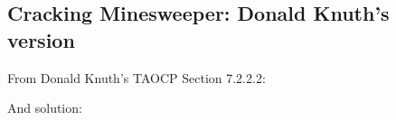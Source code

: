 \subsection{Cracking Minesweeper: Donald Knuth's version}

\renewcommand{\CURPATH}{equations/minesweeper_Knuth}

From Donald Knuth's TAOCP Section 7.2.2.2:

\begin{figure}[H]
\centering
{}
\end{figure}

\begin{figure}[H]
\centering
{}
\end{figure}

And solution:

\begin{figure}[H]
\centering
{}
\end{figure}

\begin{figure}[H]
\centering
{}
\end{figure}
